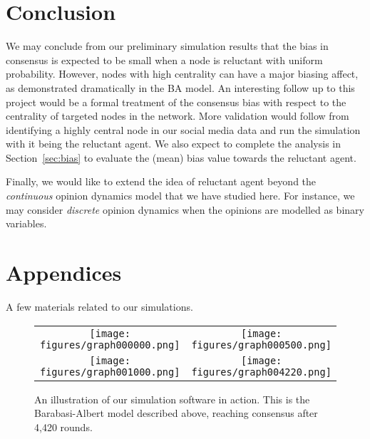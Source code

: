 \documentclass[letter]{article}
\theoremstyle{remark}
\begin{document}
\section{Conclusion}
We may conclude from our preliminary simulation results that the bias in consensus is expected to be small when a node is reluctant with uniform probability. However, nodes with high centrality can have a major biasing affect, as demonstrated dramatically in the BA model. An interesting follow up to this project would be a formal treatment of the consensus bias with respect to the centrality of targeted nodes in the network. More validation would follow from identifying a highly central node in our social media data and run the simulation with it being the reluctant agent. 
We also expect to complete the analysis in Section~\ref{sec:bias} to evaluate the (mean) bias value towards the reluctant agent. 

Finally, we would like to extend the idea of reluctant agent beyond the \emph{continuous} opinion dynamics model that we have studied here. For instance, we may consider \emph{discrete} opinion dynamics when the opinions are modelled as binary variables. 


\pagebreak
\section{Appendices}

A few materials related to our simulations. 
\begin{figure}[h]
  \begin{tabular}{c c}
    \texttt{[image: figures/graph000000.png]} &
    \texttt{[image: figures/graph000500.png]} \\ 
    \texttt{[image: figures/graph001000.png]} &
    \texttt{[image: figures/graph004220.png]} 
  \end{tabular}
  \caption{An illustration of our simulation software in action. This is the Barabasi-Albert model described above, reaching consensus after 4,420 rounds. }
\end{figure}
\end{document}

